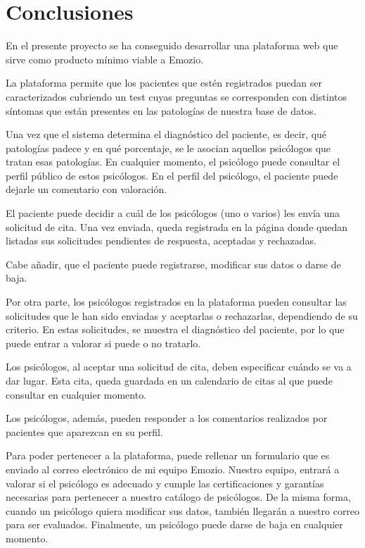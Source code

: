 \chapter{Conclusiones}

En el presente proyecto se ha conseguido desarrollar una plataforma web que sirve como producto mínimo viable a Emozio.


La plataforma permite que los pacientes que estén registrados puedan ser caracterizados cubriendo un test cuyas preguntas se corresponden con distintos síntomas que están presentes en las patologías de nuestra base de datos.


Una vez que el sistema determina el diagnóstico del paciente, es decir, qué patologías padece y en qué porcentaje, se le asocian aquellos psicólogos que tratan esas patologías. En cualquier momento, el psicólogo puede consultar el perfil público de estos psicólogos. En el perfil del psicólogo, el paciente puede dejarle un comentario con valoración.


El paciente puede decidir a cuál de los psicólogos (uno o varios) les envía una solicitud de cita. Una vez enviada, queda registrada en la página donde quedan listadas sus solicitudes pendientes de respuesta, aceptadas y rechazadas.


Cabe añadir, que el paciente puede registrarse, modificar sus datos o darse de baja.


Por otra parte, los psicólogos registrados en la plataforma pueden consultar las solicitudes que le han sido enviadas y aceptarlas o rechazarlas, dependiendo de su criterio. En estas solicitudes, se muestra el diagnóstico del paciente, por lo que puede entrar a valorar si puede o no tratarlo.


Los psicólogos, al aceptar una solicitud de cita, deben especificar cuándo se va a dar lugar. Esta cita, queda guardada en un calendario de citas al que puede consultar en cualquier momento.


Los psicólogos, además, pueden responder a los comentarios realizados por pacientes que aparezcan en su perfil.


Para poder pertenecer a la plataforma, puede rellenar un formulario que es enviado al correo electrónico de mi equipo Emozio. Nuestro equipo, entrará a valorar si el psicólogo es adecuado y cumple las certificaciones y garantías necesarias para pertenecer a nuestro catálogo de psicólogos. De la misma forma, cuando un psicólogo quiera modificar sus datos, también llegarán a nuestro correo para ser evaluados. Finalmente, un psicólogo puede darse de baja en cualquier momento.


